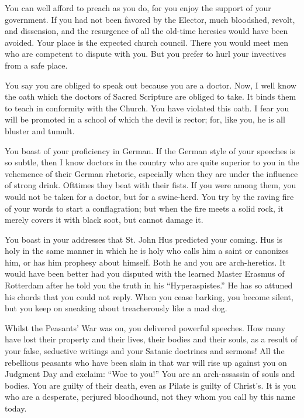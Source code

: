 You can well afford to preach as you do, for you enjoy the support of
your government. If you had not been favored by the Elector, much bloodshed,
revolt, and dissension, and the resurgence of all the old-time heresies
would have been avoided. Your place is the expected church council. There
you would meet men who are competent to dispute with you. But you prefer
to hurl your invectives from a safe place.

You say you are obliged to speak out because you are a doctor. Now,
I well know the oath which the doctors of Sacred Scripture are obliged to
take. It binds them to teach in conformity with the Church. You have
violated this oath. I fear you will be promoted in a school of which the devil
is rector; for, like you, he is all bluster and tumult.

You boast of your proficiency in German. If the German style of your
speeches is so subtle, then I know doctors in the country who are quite superior
to you in the vehemence of their German rhetoric, especially when
they are under the influence of strong drink. Ofttimes they beat with their
fists. If you were among them, you would not be taken for a doctor, but
for a swine-herd. You try by the raving fire of your words to start
a conflagration; but when the fire meets a solid rock, it merely covers it with
black soot, but cannot damage it.

You boast in your addresses that St. John Hus predicted your coming.
Hus is holy in the same manner in which he is holy who calls him a saint
or canonizes him, or has him prophesy about himself. Both he and you are
arch-heretics. It would have been better had you disputed with the learned
Master Erasmus of Rotterdam after he told you the
truth in his “Hyperaspistes.” He has so attuned his chords that you
could not reply. When you cease barking, you become silent, but you keep on sneaking about
treacherously like a mad dog.

Whilst the Peasants’ War was on, you delivered powerful speeches. How
many have lost their property and their lives, their bodies and their souls, as
a result of your false, seductive writings and your Satanic doctrines and
sermons! All the rebellious peasants who have been slain in that war will rise
up against you on Judgment Day and exclaim: “Woe to you!” You are an
arch-assassin of souls and bodies. You are guilty of their death, even as Pilate
is guilty of Christ’s. It is you who are a desperate, perjured bloodhound, not
they whom you call by this name today.

